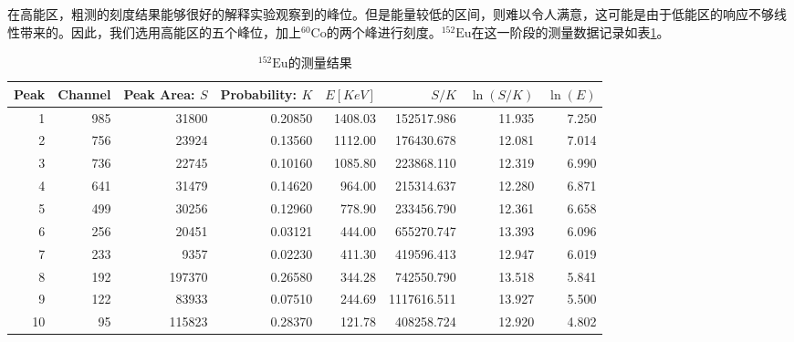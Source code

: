 \documentclass{article}
\begin{document}
在高能区，粗测的刻度结果能够很好的解释实验观察到的峰位。但是能量较低的区间，则难以令人满意，这可能是由于低能区的响应不够线性带来的。因此，我们选用高能区的五个峰位，加上$^{60}\text{Co}$的两个峰进行刻度。$^{152}\text{Eu}$在这一阶段的测量数据记录如表\ref{tab:152Eu_full}。
\begin{table}[htbp]
    \centering
    \caption{$^{152}\text{Eu}$的测量结果\label{tab:152Eu_full}}
    \begin{tabular}{rrrrrrrr}
\toprule
Peak &  Channel &  Peak Area: $S$ &  Probability: $K$ &        $E[\si{KeV}]$ &          $S/K$ &  $\ln(S/K)$ &  $\ln(E)$ \\
\midrule
1    &      985 &      31800 &      0.20850 &  1408.03 &   152517.986 &   11.935 &  7.250 \\
2    &      756 &      23924 &      0.13560 &  1112.00 &   176430.678 &   12.081 &  7.014 \\
3    &      736 &      22745 &      0.10160 &  1085.80 &   223868.110 &   12.319 &  6.990 \\
4    &      641 &      31479 &      0.14620 &   964.00 &   215314.637 &   12.280 &  6.871 \\
5    &      499 &      30256 &      0.12960 &   778.90 &   233456.790 &   12.361 &  6.658 \\
6    &      256 &      20451 &      0.03121 &   444.00 &   655270.747 &   13.393 &  6.096 \\
7    &      233 &       9357 &      0.02230 &   411.30 &   419596.413 &   12.947 &  6.019 \\
8    &      192 &     197370 &      0.26580 &   344.28 &   742550.790 &   13.518 &  5.841 \\
9    &      122 &      83933 &      0.07510 &   244.69 &  1117616.511 &   13.927 &  5.500 \\
10   &       95 &     115823 &      0.28370 &   121.78 &   408258.724 &   12.920 &  4.802 \\
\bottomrule
\end{tabular}
\end{table}
\end{document}
